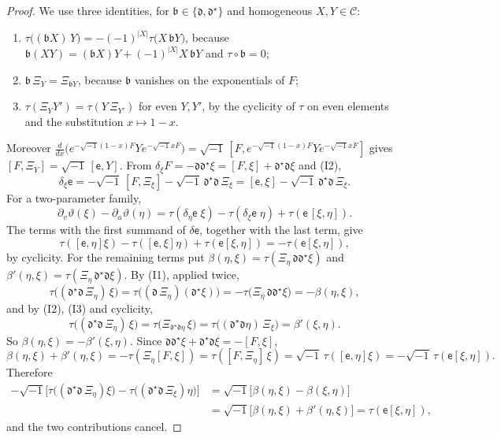 \begin{proof}
We use three identities, for $\mathfrak b\in\{\mathfrak d,\mathfrak d^\star\}$
and homogeneous $X,Y\in\mathcal C$:
\begin{enumerate}
\item[(I1)] $\tau\bigl((\mathfrak bX)\,Y\bigr)=-(-1)^{|X|}\tau\bigl(X\,\mathfrak bY\bigr)$,
 because $\mathfrak b(XY)=(\mathfrak bX)Y+(-1)^{|X|}X\,\mathfrak bY$ and
 $\tau\circ\mathfrak b=0$;
\item[(I2)] $\mathfrak b\,\Xi_Y=\Xi_{\mathfrak bY}$, because $\mathfrak b$
 vanishes on the exponentials of $F$;
\item[(I3)] $\tau(\Xi_YY')=\tau(Y\,\Xi_{Y'})$ for even $Y,Y'$, by the
 cyclicity of $\tau$ on even elements and the substitution $x\mapsto1-x$.
\end{enumerate}
Moreover $\frac d{dx}\bigl(e^{-\sqrt{-1}(1-x)F}Ye^{-\sqrt{-1}xF}\bigr)
=\sqrt{-1}\,[F,e^{-\sqrt{-1}(1-x)F}Ye^{-\sqrt{-1}xF}]$ gives
$[F,\Xi_Y]=\sqrt{-1}\,[\mathsf e,Y]$. From
$\delta_\xi F=-\mathfrak d\mathfrak d^\star\xi=[F,\xi]+\mathfrak d^\star\mathfrak d\xi$
and (I2),
\[
 \delta_\xi\mathsf e=-\sqrt{-1}\,[F,\Xi_\xi]-\sqrt{-1}\,\mathfrak d^\star\mathfrak d\,\Xi_\xi
 =[\mathsf e,\xi]-\sqrt{-1}\,\mathfrak d^\star\mathfrak d\,\Xi_\xi .
\]
For a two-parameter family,
\[
 \partial_v\vartheta(\xi)-\partial_u\vartheta(\eta)
 =\tau(\delta_\eta\mathsf e\;\xi)-\tau(\delta_\xi\mathsf e\;\eta)
 +\tau(\mathsf e\,[\xi,\eta]).
\]
The terms with the first summand of $\delta\mathsf e$, together with the last
term, give
\[
 \tau([\mathsf e,\eta]\xi)-\tau([\mathsf e,\xi]\eta)+\tau(\mathsf e[\xi,\eta])
 =-\tau(\mathsf e[\xi,\eta]),
\]
by cyclicity. For the remaining terms put
$\beta(\eta,\xi)=\tau(\Xi_\eta\,\mathfrak d\mathfrak d^\star\xi)$ and
$\beta'(\eta,\xi)=\tau(\Xi_\eta\,\mathfrak d^\star\mathfrak d\xi)$. By (I1),
applied twice,
\[
 \tau\bigl((\mathfrak d^\star\mathfrak d\,\Xi_\eta)\,\xi\bigr)
 =\tau\bigl((\mathfrak d\,\Xi_\eta)(\mathfrak d^\star\xi)\bigr)
 =-\tau\bigl(\Xi_\eta\,\mathfrak d\mathfrak d^\star\xi\bigr)=-\beta(\eta,\xi),
\]
and by (I2), (I3) and cyclicity,
\[
 \tau\bigl((\mathfrak d^\star\mathfrak d\,\Xi_\eta)\,\xi\bigr)
 =\tau\bigl(\Xi_{\mathfrak d^\star\mathfrak d\eta}\,\xi\bigr)
 =\tau\bigl((\mathfrak d^\star\mathfrak d\eta)\,\Xi_\xi\bigr)=\beta'(\xi,\eta).
\]
So $\beta(\eta,\xi)=-\beta'(\xi,\eta)$. Since
$\mathfrak d\mathfrak d^\star\xi+\mathfrak d^\star\mathfrak d\xi=-[F,\xi]$,
\[
 \beta(\eta,\xi)+\beta'(\eta,\xi)=-\tau(\Xi_\eta[F,\xi])=\tau([F,\Xi_\eta]\,\xi)
 =\sqrt{-1}\,\tau([\mathsf e,\eta]\xi)=-\sqrt{-1}\,\tau(\mathsf e[\xi,\eta]).
\]
Therefore
\begin{align*}
 -\sqrt{-1}\bigl[\tau\bigl((\mathfrak d^\star\mathfrak d\,\Xi_\eta)\xi\bigr)
 -\tau\bigl((\mathfrak d^\star\mathfrak d\,\Xi_\xi)\eta\bigr)\bigr]
 &=\sqrt{-1}\bigl[\beta(\eta,\xi)-\beta(\xi,\eta)\bigr]\\
 &=\sqrt{-1}\bigl[\beta(\eta,\xi)+\beta'(\eta,\xi)\bigr]=\tau(\mathsf e[\xi,\eta]),
\end{align*}
and the two contributions cancel.
\end{proof}

